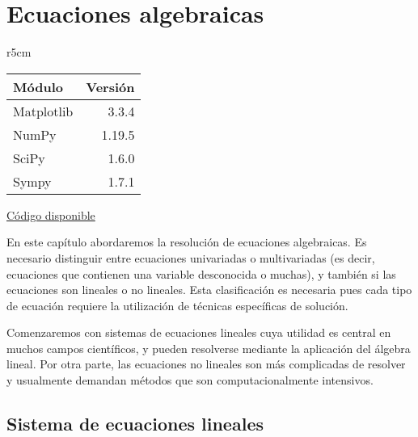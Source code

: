 

\chapter{Ecuaciones algebraicas} \label{ch:algebraicas}


\begin{wraptable}{r}{5cm}
\begin{modulesinfo}
\begin{center}
{\small
    \begin{tabular}{l r}
        \toprule
        \textbf{Módulo} & \textbf{Versión} \\
        \midrule
        Matplotlib & 3.3.4 \\
        NumPy & 1.19.5 \\
        SciPy & 1.6.0 \\
        Sympy & 1.7.1 \\
        \bottomrule
    \end{tabular}
    \vspace{0.75em}
    
    \href{https://github.com/facundobatista/libro-pyciencia/tree/master/código/ecuaciones_algebraicas/}{Código disponible}
}
\end{center}
\end{modulesinfo}
\end{wraptable}

En este capítulo abordaremos la resolución de ecuaciones algebraicas. Es necesario distinguir entre ecuaciones univariadas o multivariadas (es decir, ecuaciones que contienen una variable desconocida o muchas), y también si las ecuaciones son lineales o no lineales. Esta clasificación es necesaria pues cada tipo de ecuación requiere la utilización de técnicas específicas de solución.

Comenzaremos con sistemas de ecuaciones lineales cuya utilidad es central en muchos campos científicos, y pueden resolverse mediante la aplicación del álgebra lineal. Por otra parte, las ecuaciones no lineales son más complicadas de resolver y usualmente demandan métodos que son computacionalmente intensivos.


\section{Sistema de ecuaciones lineales}

